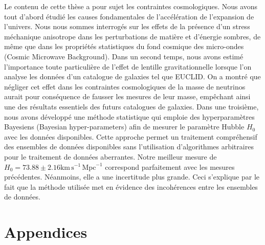 \documentclass[12pt]{report}
\newcommand{\km}{\mathrm{km}}
\newcommand{\second}{\mathrm{s}}
\newcommand{\Mpc}{\mathrm{Mpc}}
\renewcommand{\(}{\left(}
\renewcommand{\)}{\right)}
\renewcommand{\[}{\left[}
\renewcommand{\]}{\right]}
\begin{document}
Le contenu de cette th\`{e}se a pour sujet les contraintes cosmologiques. Nous avons tout d'abord \'{e}tudi\'{e} les  causes fondamentales de l'acc\'{e}l\'{e}ration de l'ex\-pansion de l'univers. Nous nous sommes interrog\'{e}s sur les effets de la pr\'{e}sence d'un stress m\'{e}chanique anisotrope dans les perturbations de mati\`{e}re et d'\'{e}nergie sombres, de m\^{e}me que dans les propri\'{e}t\'{e}s statistiques du fond cosmique des micro-ondes (Cosmic Microwave Background). Dans un second temps, nous avons estim\'{e} l'importance toute particuli\`{e}re de l'effet de lentille gravitationnelle lorsque l'on analyse les donn\'{e}es d'un catalogue de galaxies tel que EUCLID. On a montr\'{e} que n\'{e}gliger cet effet dans les contraintes cosmologiques de la masse de neutrinos aurait pour cons\'{e}quence de fausser les mesures de leur masse, emp\^{e}chant ainsi une des r\'{e}sultats essentiels des futurs catalogues de galaxies. Dans une troisi\`{e}me, nous avons d\'{e}velopp\'{e} une m\'{e}thode statistique qui emploie des hyperparam\`{e}tres Bayesiens (Bayesian hyper-parameters) afin de mesurer le param\`{e}tre Hubble $H_0$ avec les donn\'{e}es disponibles. Cette approche permet un traitement compr\'{e}hensif des ensembles de donn\'{e}es disponibles sans l'utilisation d'algorithmes arbitraires pour le traitement de donn\'{e}es aberrantes. Notre meilleur mesure de $H_0 = 73.88 \pm 2.16 \km\, \second^{-1}\, \Mpc^{-1}$ correspond parfaitement avec les mesures pr\'{e}c\'{e}dentes. N\'{e}anmoins, elle a une incertitude plus grande. Ceci s'explique par le fait que la m\'{e}thode utilis\'{e}e met en \'{e}vidence des incoh\'{e}rences entre les ensembles de donn\'{e}es. 

\tableofcontents



\newpage




%











\chapter*{Appendices}  

\appendix





%

%


%


%
\end{document}
